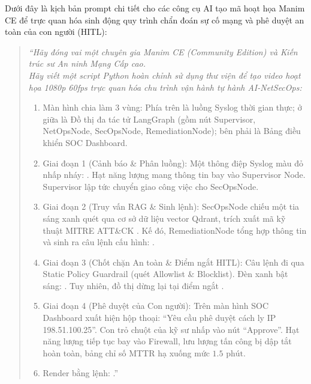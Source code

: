 \begin{simulationbox}
Dưới đây là kịch bản prompt chi tiết cho các công cụ AI tạo mã hoạt họa Manim CE để trực quan hóa sinh động quy trình chẩn đoán sự cố mạng và phê duyệt an toàn của con người (HITL):

\begin{quote}
\small\itshape
``Hãy đóng vai một chuyên gia Manim CE (Community Edition) và Kiến trúc sư An ninh Mạng Cấp cao. \\
Hãy viết một script Python hoàn chỉnh sử dụng thư viện  để tạo video hoạt họa 1080p 60fps trực quan hóa chu trình vận hành tự hành AI-NetSecOps:
\begin{enumerate}
  \item Màn hình chia làm 3 vùng: Phía trên là luồng Syslog thời gian thực; ở giữa là Đồ thị đa tác tử LangGraph (gồm nút Supervisor, NetOpsNode, SecOpsNode, RemediationNode); bên phải là Bảng điều khiển SOC Dashboard.
  \item Giai đoạn 1 (Cảnh báo \& Phân luồng): Một thông điệp Syslog màu đỏ nhấp nháy: . Hạt năng lượng mang thông tin bay vào Supervisor Node. Supervisor lập tức chuyển giao công việc cho SecOpsNode.
  \item Giai đoạn 2 (Truy vấn RAG \& Sinh lệnh): SecOpsNode chiếu một tia sáng xanh quét qua cơ sở dữ liệu vector Qdrant, trích xuất mã kỹ thuật MITRE ATT\&CK . Kế đó, RemediationNode tổng hợp thông tin và sinh ra câu lệnh cấu hình: .
  \item Giai đoạn 3 (Chốt chặn An toàn \& Điểm ngắt HITL): Câu lệnh đi qua Static Policy Guardrail (quét Allowlist \& Blocklist). Đèn xanh bật sáng: . Tuy nhiên, đồ thị dừng lại tại điểm ngắt .
  \item Giai đoạn 4 (Phê duyệt của Con người): Trên màn hình SOC Dashboard xuất hiện hộp thoại: ``Yêu cầu phê duyệt cách ly IP 198.51.100.25''. Con trỏ chuột của kỹ sư nhấp vào nút ``Approve''. Hạt năng lượng tiếp tục bay vào Firewall, lưu lượng tấn công bị dập tắt hoàn toàn, bảng chỉ số MTTR hạ xuống mức $1.5\text{ phút}$.
  \item Render bằng lệnh: .''
\end{enumerate}
\end{quote}
\end{simulationbox}

